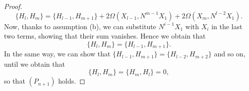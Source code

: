 \documentclass[10pt,a4paper]{amsart}
\def\parpo#1#2{\{#1,#2\}}
\begin{document}
\begin{proof}
\begin{equation}
\label{recadd3}
\parpo{H_l}{H_m}%
=\parpo{H_{l-1}}{H_{m+1}}+2\Omega(X_{l-1},{N}^{m-1} X_1)+2\Omega(X_m,{N}^{l-2} X_1).
\end{equation}
Now, thanks to assumption (b), we can substitute ${N}^{i-1}X_1$ with $X_{i}$ in the 
last two terms, showing that their sum vanishes. Hence we obtain that 
\begin{equation}
\label{recadd4}
\parpo{H_l}{H_m}=\parpo{H_{l-1}}{H_{m+1}}.
\end{equation}
In the same way, we can show that $\parpo{H_{l-1}}{H_{m+1}}=\parpo{H_{l-2}}{H_{m+2}}$ and so on, until we obtain that 
\begin{equation}
\label{recadd5}
\parpo{H_l}{H_m}=\parpo{H_{m}}{H_{l}}=0,
\end{equation}
so that $(P_{n+1})$ holds.
\end{proof}  %
\end{document}
